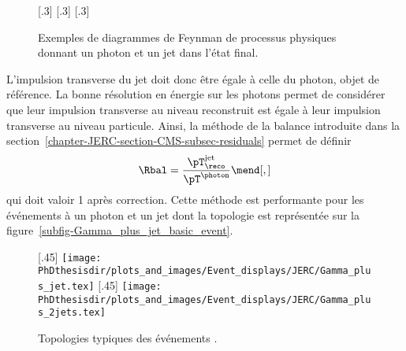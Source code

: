 \begin{figure}[h]
\centering\vspace{\baselineskip}
\subcaptionbox{\label{subfig-fgraph-gq_qGamma_S}}[.3\textwidth]
{\vspace{\baselineskip}}
\hfill
\subcaptionbox{\label{subfig-fgraph-gq_qGamma_T}}[.3\textwidth]
{\vspace{\baselineskip}}
\hfill
\subcaptionbox{\label{subfig-fgraph-qq_gGamma}}[.3\textwidth]
{\vspace{\baselineskip}}
\caption[Diagrammes de Feynman donnant un photon et un jet dans l'état final.]{Exemples de diagrammes de Feynman de processus physiques donnant un photon et un jet dans l'état final.}
\label{fig-fgraph-gamma_plus_jets}
\end{figure}
\par L'impulsion transverse du jet doit donc être égale à celle du photon, objet de référence.
La bonne résolution en énergie sur les photons permet de considérer que leur impulsion transverse au niveau reconstruit est égale à leur impulsion transverse au niveau particule.
Ainsi, la méthode de la balance introduite dans la section~\ref{chapter-JERC-section-CMS-subsec-residuals} permet de définir
\begin{equation}
\Rbal = \frac{\pT_\reco^\text{jet}}{\pT^{\photon}}
\mend[,]
\end{equation}
qui doit valoir 1 après correction.
Cette méthode est performante pour les événements à un photon et un jet dont la topologie est représentée sur la figure~\ref{subfig-Gamma_plus_jet_basic_event}.
\begin{figure}[h]
\centering
{}[.45\textwidth]
{\texttt{[image: \\PhDthesisdir/plots\_and\_images/Event\_displays/JERC/Gamma\_plus\_jet.tex]}}
\hfill
{}[.45\textwidth]
{\texttt{[image: \\PhDthesisdir/plots\_and\_images/Event\_displays/JERC/Gamma\_plus\_2jets.tex]}}
\caption{Topologies typiques des événements \Gjets.}
\label{fig-Gamma_plus_jet_events}
\end{figure}
